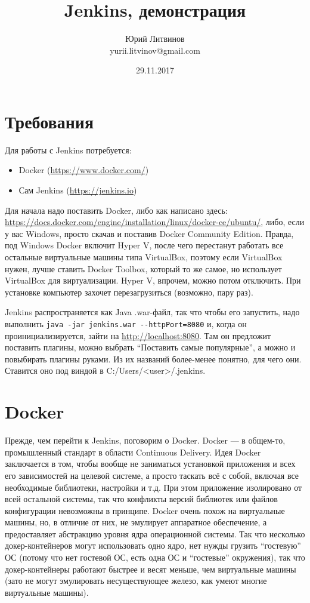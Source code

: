 \documentclass[a5paper]{article}
\title{Jenkins, демонстрация}
\author{Юрий Литвинов\\\small{yurii.litvinov@gmail.com}}
\date{29.11.2017}
\begin{document}
\maketitle
\thispagestyle{empty}

\section{Требования}

Для работы с Jenkins потребуется:
\begin{itemize}
	\item Docker (\url{https://www.docker.com/})
	\item Сам Jenkins (\url{https://jenkins.io})
\end{itemize}

Для начала надо поставить Docker, либо как написано здесь: \url{https://docs.docker.com/engine/installation/linux/docker-ce/ubuntu/}, либо, если у вас Windows, просто скачав и поставив Docker Community Edition.
Правда, под Windows Docker включит Hyper V, после чего перестанут работать все остальные виртуальные машины типа VirtualBox, поэтому если VirtualBox нужен, лучше ставить Docker Toolbox, который то же самое, но
использует VirtualBox для виртуализации. Hyper V, впрочем, можно потом отключить. При установке компьютер захочет перезагрузиться (возможно, пару раз).

Jenkins распространяется как Java .war-файл, так что чтобы его запустить, надо выполнить \verb|java -jar jenkins.war --httpPort=8080| и, когда он проинициализируется, зайти на \url{http://localhost:8080}.
Там он предложит поставить плагины, можно выбрать ``Поставить самые популярные'', а можно и повыбирать плагины руками. Из их названий более-менее понятно, для чего они. Ставится оно под виндой в
C:/Users/<user>/.jenkins.

\section{Docker}

Прежде, чем перейти к Jenkins, поговорим о Docker. Docker --- в общем-то, промышленный стандарт в области Continuous Delivery. Идея Docker заключается в том, чтобы вообще не заниматься установкой приложения
и всех его зависимостей на целевой системе, а просто таскать всё с собой, включая все необходимые библиотеки, настройки и т.д. При этом приложение изолировано от всей остальной системы, так что конфликты версий 
библиотек или файлов конфигурации невозможны в принципе. Docker очень похож на виртуальные машины, но, в отличие от них, не эмулирует аппаратное обеспечение, а предоставляет абстракцию уровня ядра операционной
системы. Так что несколько докер-контейнеров могут использовать одно ядро, нет нужды грузить ``гостевую'' ОС (потому что нет гостевой ОС, есть одна ОС и ``гостевые'' окружения), так что докер-контейнеры работают
быстрее и весят меньше, чем виртуальные машины (зато не могут эмулировать несуществующее железо, как умеют многие виртуальные машины).
\end{document}
